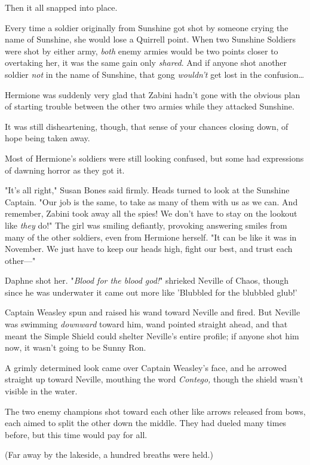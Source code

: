 Then it all snapped into place.

Every time a soldier originally from Sunshine got shot by someone crying the 
name of Sunshine, she would lose a Quirrell point. When two Sunshine Soldiers 
were shot by either army, \emph{both} enemy armies would be two points closer 
to overtaking her, it was the same gain only \emph{shared}. And if anyone shot 
another soldier \emph{not} in the name of Sunshine, that gong \emph{wouldn't} 
get lost in the confusion{\ldots}

Hermione was suddenly very glad that Zabini hadn't gone with the obvious plan 
of starting trouble between the other two armies while they attacked Sunshine.

It was still disheartening, though, that sense of your chances closing down, of 
hope being taken away.

Most of Hermione's soldiers were still looking confused, but some had 
expressions of dawning horror as they got it.

"It's all right," Susan Bones said firmly. Heads turned to look at the Sunshine 
Captain. "Our job is the same, to take as many of them with us as we can. And 
remember, Zabini took away all the spies! We don't have to stay on the lookout 
like \emph{they} do!" The girl was smiling defiantly, provoking answering 
smiles from many of the other soldiers, even from Hermione herself. "It can be 
like it was in November. We just have to keep our heads high, fight our best, 
and trust each other---"

Daphne shot her.
\sbreak
"\emph{Blood for the blood god!}" shrieked Neville of Chaos, though since he 
was underwater it came out more like 'Blubbled for the blubbled glub!'

Captain Weasley spun and raised his wand toward Neville and fired. But Neville 
was swimming \emph{downward} toward him, wand pointed straight ahead, and that 
meant the Simple Shield could shelter Neville's entire profile; if anyone shot 
him now, it wasn't going to be Sunny Ron.

A grimly determined look came over Captain Weasley's face, and he arrowed 
straight up toward Neville, mouthing the word \emph{Contego,} though the shield 
wasn't visible in the water.

The two enemy champions shot toward each other like arrows released from bows, 
each aimed to split the other down the middle. They had dueled many times 
before, but this time would pay for all.

(Far away by the lakeside, a hundred breaths were held.)

